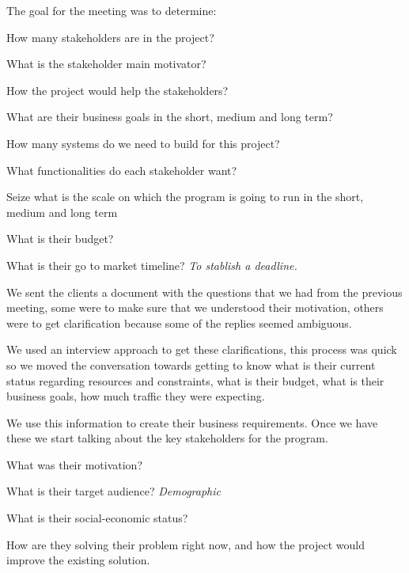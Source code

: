 \noindent The goal for the meeting was to determine:
\begin{packed_enum}
    \item How many stakeholders are in the project?
    \item What is the stakeholder main motivator?
    \item How the project would help the stakeholders?
    \item What are their business goals in the short, medium and long term?
    \item How many systems do we need to build for this project?
    \item What functionalities do each stakeholder want? 
    \item Seize what is the scale on which the program is going to run in the 
    short, medium and long term
    \item What is their budget?
    \item What is their go to market timeline? \textit{To stablish a deadline.}
\end{packed_enum}

\noindent We sent the clients a document with the questions that we had from 
the previous meeting, some were to make sure that we understood their 
motivation, others were to get clarification because some of the replies 
seemed ambiguous.\newline

\noindent We used an interview approach to get these clarifications, this 
process was quick so we moved the conversation towards getting to know what is 
their current status regarding resources and constraints, what is their budget, 
what is their business goals, how much traffic they were expecting.\newline

\noindent We use this information to create their business requirements. Once 
we have these we start talking about the key stakeholders for the program. 
\begin{packed_enum}
    \item What was their motivation? 
    \item What is their target audience? \textit{Demographic}
    \item What is their social-economic status? 
    \item How are they solving their problem right now, and how the project 
    would improve the existing solution.
\end{packed_enum}


